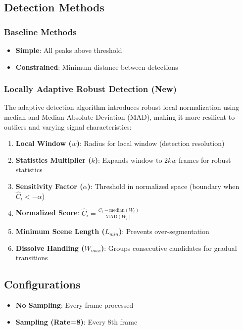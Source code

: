 \documentclass[11pt,a4paper]{article}
\begin{document}
\subsection{Detection Methods}

\subsubsection{Baseline Methods}
\begin{itemize}
    \item \textbf{Simple}: All peaks above threshold
    \item \textbf{Constrained}: Minimum distance between detections
\end{itemize}

\subsubsection{Locally Adaptive Robust Detection (New)}
The adaptive detection algorithm introduces robust local normalization using median and Median Absolute Deviation (MAD), making it more resilient to outliers and varying signal characteristics:

\begin{enumerate}
    \item \textbf{Local Window ($w$)}: Radius for local window (detection resolution)
    \item \textbf{Statistics Multiplier ($k$)}: Expands window to $2kw$ frames for robust statistics
    \item \textbf{Sensitivity Factor ($\alpha$)}: Threshold in normalized space (boundary when $\hat{C}_i < -\alpha$)
    \item \textbf{Normalized Score}: $\hat{C}_i = \frac{C_i - \text{median}(W_i)}{\text{MAD}(W_i)}$
    \item \textbf{Minimum Scene Length ($L_{min}$)}: Prevents over-segmentation
    \item \textbf{Dissolve Handling ($W_{max}$)}: Groups consecutive candidates for gradual transitions
\end{enumerate}

\subsection{Configurations}
\begin{itemize}
    \item \textbf{No Sampling}: Every frame processed
    \item \textbf{Sampling (Rate=8)}: Every 8th frame
\end{itemize}
\end{document}
